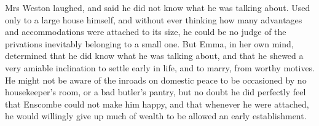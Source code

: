Mrs Weston laughed, and said he did not know what he was talking about. Used only to a large house himself, and without ever thinking how many advantages and accommodations were attached to its size, he could be no judge of the privations inevitably belonging to a small one. But Emma, in her own mind, determined that he did know what he was talking about, and that he shewed a very amiable inclination to settle early in life, and to marry, from worthy motives. He might not be aware of the inroads on domestic peace to be occasioned by no housekeeper's room, or a bad butler's pantry, but no doubt he did perfectly feel that Enscombe could not make him happy, and that whenever he were attached, he would willingly give up much of wealth to be allowed an early establishment.